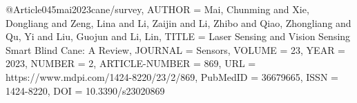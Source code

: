 @Article{045mai2023cane/survey,
AUTHOR = {Mai, Chunming and Xie, Dongliang and Zeng, Lina and Li, Zaijin and Li, Zhibo and Qiao, Zhongliang and Qu, Yi and Liu, Guojun and Li, Lin},
TITLE = {Laser Sensing and Vision Sensing Smart Blind Cane: A Review},
JOURNAL = {Sensors},
VOLUME = {23},
YEAR = {2023},
NUMBER = {2},
ARTICLE-NUMBER = {869},
URL = {https://www.mdpi.com/1424-8220/23/2/869},
PubMedID = {36679665},
ISSN = {1424-8220},
DOI = {10.3390/s23020869}
}
